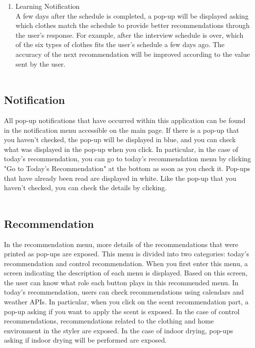 \documentclass[conference]{IEEEtran}
\begin{document}
\begin{enumerate}
\break

    \item Learning Notification\\
        A few days after the schedule is completed, a pop-up will be displayed asking which clothes match the schedule to provide better recommendations through the user's response. For example, after the interview schedule is over, which of the six types of clothes fits the user's schedule a few days ago. The accuracy of the next recommendation will be improved according to the value sent by the user. \\ \\
\end{enumerate}

\subsection{Notification}
All pop-up notifications that have occurred within this application can be found in the notification menu accessible on the main page. If there is a pop-up that you haven't checked, the pop-up will be displayed in blue, and you can check what was displayed in the pop-up when you click. In particular, in the case of today's recommendation, you can go to today's recommendation menu by clicking "Go to Today's Recommendation" at the bottom as soon as you check it. Pop-ups that have already been read are displayed in white. Like the pop-up that you haven't checked, you can check the details by clicking. \\ \\

\subsection{Recommendation}
In the recommendation menu, more details of the recommendations that were printed as pop-ups are exposed. This menu is divided into two categories: today's recommendation and control recommendation. When you first enter this menu, a screen indicating the description of each menu is displayed. Based on this screen, the user can know what role each button plays in this recommended menu. In today's recommendation, users can check recommendations using calendars and weather APIs. In particular, when you click on the scent recommendation part, a pop-up asking if you want to apply the scent is exposed. In the case of control recommendations, recommendations related to the clothing and home environment in the styler are exposed. In the case of indoor drying, pop-ups asking if indoor drying will be performed are exposed. \\ \\
\end{document}
